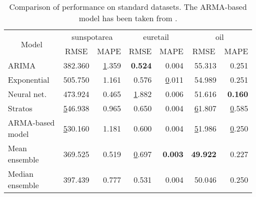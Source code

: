\begin{table}[]
\centering
\caption{Comparison of performance on standard datasets. The ARMA-based model has been taken from \cite{Roy_2011}.}
\begin{tabular}{|l|l|r|r|r|r|r|}
\hline
\multicolumn{1}{|c|}{\multirow{2}{*}{Model}} & \multicolumn{2}{c|}{sunspotarea}                                  & \multicolumn{2}{c|}{euretail}                                        & \multicolumn{2}{c|}{oil}                                              \\ \cline{2-7} 
\multicolumn{1}{|c|}{}                       & \multicolumn{1}{c|}{RMSE} & \multicolumn{1}{c|}{MAPE}             & \multicolumn{1}{c|}{RMSE}    & \multicolumn{1}{c|}{MAPE}             & \multicolumn{1}{c|}{RMSE}              & \multicolumn{1}{c|}{MAPE}    \\ \hline
ARIMA                                        & 382.360                 & {\ul 1.359}                         & \textbf{0.524}             & 0.004                               & 55.313                               & 0.251                      \\ \hline
Exponential                                  & 505.750                 & 1.161                               & 0.576                      & {\ul 0.011}                         & 54.989                               & 0.251                      \\ \hline
Neural net.                                  & 473.924                 & 0.465                               & {\ul 1.882}                & 0.006                               & 51.616                               & \textbf{0.160}             \\ \hline
Stratos                                      & {\ul 546.938}           & 0.965                               & 0.650                      & 0.004                               & {\ul 61.807}                         & {\ul 0.585}                \\ \hline
ARMA-based model                                      & {\ul 530.160}           & 1.181                               & 0.600                      & 0.004                           & {\ul 51.986}                         & {\ul 0.250}                \\ \hline

Mean ensemble                                  & 369.525                 & 0.519                               & {\ul 0.697}                & \textbf{0.003}                               & \textbf{49.922}                              & 0.227             \\ \hline
Median ensemble                                  & 397.439                 & 0.777                               & 0.531                & 0.004                               & 50.046                              &  0.250             \\ \hline


\end{tabular}
\end{table}
